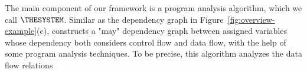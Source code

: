 The main component of our framework is a program analysis algorithm, which we call ${\THESYSTEM}$. 
Similar as the dependency graph in Figure~\ref{fig:overview-example}(c), {\THESYSTEM} constructs a "may" dependency graph between assigned variables whose dependency both considers control flow and data flow, with the help of some program analysis techniques. To be precise, 
this algorithm analyzes the data flow relations 
